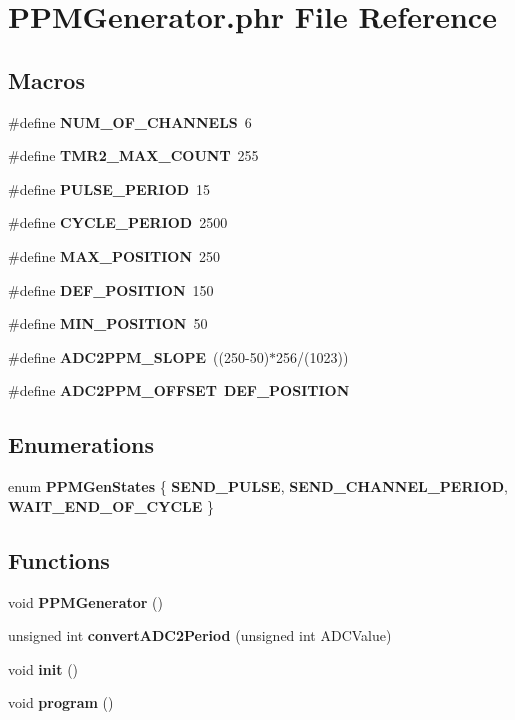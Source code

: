 \section{P\-P\-M\-Generator.\-phr File Reference}
\label{_p_p_m_generator_8phr}
\subsection*{Macros}
\begin{DoxyCompactItemize}
\item 
\#define {\bf N\-U\-M\-\_\-\-O\-F\-\_\-\-C\-H\-A\-N\-N\-E\-L\-S}~6
\item 
\#define {\bf T\-M\-R2\-\_\-\-M\-A\-X\-\_\-\-C\-O\-U\-N\-T}~255
\item 
\#define {\bf P\-U\-L\-S\-E\-\_\-\-P\-E\-R\-I\-O\-D}~15
\item 
\#define {\bf C\-Y\-C\-L\-E\-\_\-\-P\-E\-R\-I\-O\-D}~2500
\item 
\#define {\bf M\-A\-X\-\_\-\-P\-O\-S\-I\-T\-I\-O\-N}~250
\item 
\#define {\bf D\-E\-F\-\_\-\-P\-O\-S\-I\-T\-I\-O\-N}~150
\item 
\#define {\bf M\-I\-N\-\_\-\-P\-O\-S\-I\-T\-I\-O\-N}~50
\item 
\#define {\bf A\-D\-C2\-P\-P\-M\-\_\-\-S\-L\-O\-P\-E}~((250-\/50)$\ast$256/(1023))
\item 
\#define {\bf A\-D\-C2\-P\-P\-M\-\_\-\-O\-F\-F\-S\-E\-T}~{\bf D\-E\-F\-\_\-\-P\-O\-S\-I\-T\-I\-O\-N}
\end{DoxyCompactItemize}
\subsection*{Enumerations}
\begin{DoxyCompactItemize}
\item 
enum {\bf P\-P\-M\-Gen\-States} \{ {\bf S\-E\-N\-D\-\_\-\-P\-U\-L\-S\-E}, 
{\bf S\-E\-N\-D\-\_\-\-C\-H\-A\-N\-N\-E\-L\-\_\-\-P\-E\-R\-I\-O\-D}, 
{\bf W\-A\-I\-T\-\_\-\-E\-N\-D\-\_\-\-O\-F\-\_\-\-C\-Y\-C\-L\-E}
 \}
\end{DoxyCompactItemize}
\subsection*{Functions}
\begin{DoxyCompactItemize}
\item 
void {\bf P\-P\-M\-Generator} ()
\item 
unsigned int {\bf convert\-A\-D\-C2\-Period} (unsigned int A\-D\-C\-Value)
\item 
void {\bf init} ()
\item 
void {\bf program} ()
\end{DoxyCompactItemize}

